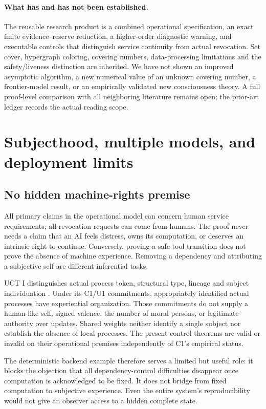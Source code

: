 \documentclass[11pt,a4paper]{article}
\theoremstyle{definition}\newtheorem{definition}{Definition}
\begin{document}
\paragraph{What has and has not been established.}
The reusable research product is a combined operational specification, an exact finite evidence--reserve reduction, a higher-order diagnostic warning, and executable controls that distinguish service continuity from actual revocation. Set cover, hypergraph coloring, covering numbers, data-processing limitations and the safety/liveness distinction are inherited. We have not shown an improved asymptotic algorithm, a new numerical value of an unknown covering number, a frontier-model result, or an empirically validated new consciousness theory. A full proof-level comparison with all neighboring literature remains open; the prior-art ledger records the actual reading scope.

\section{Subjecthood, multiple models, and deployment limits}
\subsection{No hidden machine-rights premise}
All primary claims in the operational model can concern human service requirements; all revocation requests can come from humans. The proof never needs a claim that an AI feels distress, owns its computation, or deserves an intrinsic right to continue. Conversely, proving a safe tool transition does not prove the absence of machine experience. Removing a dependency and attributing a subjective self are different inferential tasks.

UCT I distinguishes actual process token, structural type, lineage and subject individuation \cite{uct}. Under its C1/U1 commitments, appropriately identified actual processes have experiential organization. Those commitments do not supply a human-like self, signed valence, the number of moral persons, or legitimate authority over updates. Shared weights neither identify a single subject nor establish the absence of local processes. The present control theorems are valid or invalid on their operational premises independently of C1's empirical status.

The deterministic backend example therefore serves a limited but useful role: it blocks the objection that all dependency-control difficulties disappear once computation is acknowledged to be fixed. It does not bridge from fixed computation to subjective experience. Even the entire system's reproducibility would not give an observer access to a hidden complete state.
\end{document}
